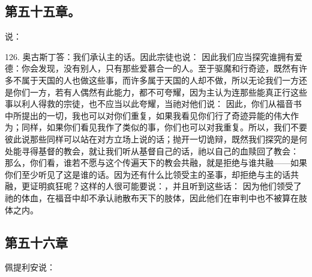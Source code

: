 
\subsection{第五十五章。}

 说：\par

126. 奥古斯丁答：我们承认主的话。因此宗徒也说： 因此我们应当探究谁拥有爱德：你会发现，没有别人，只有那些爱慕合一的人。至于驱魔和行奇迹，既然有许多不属于天国的人也做这些事，而许多属于天国的人却不做，所以无论我们一方还是你们一方，若有人偶然有此能力，都不可夸耀，因为主认为连那些能真正行这些事以利人得救的宗徒，也不应当以此夸耀，当祂对他们说： 因此，你们从福音书中所提出的一切，我也可以对你们重复，如果我看见你们行了奇迹异能的伟大作为；同样，如果你们看见我作了类似的事，你们也可以对我重复。所以，我们不要彼此说那些同样可以站在对方立场上说的话；抛开一切诡辩，既然我们探究的是何处能寻得基督的教会，就让我们听从基督自己的话，祂以自己的血赎回了教会： 那么，你们看，谁若不愿与这个传遍天下的教会共融，就是拒绝与谁共融——如果你们至少听见了这是谁的话。因为还有什么比领受主的圣事，却拒绝与主的话共融，更证明疯狂呢？这样的人很可能要说：，并且听到这些话： 因为他们领受了祂的体血，在福音中却不承认祂散布天下的肢体，因此他们在审判中也不被算在肢体之内。\par


\subsection{第五十六章}

佩提利安说：\par

